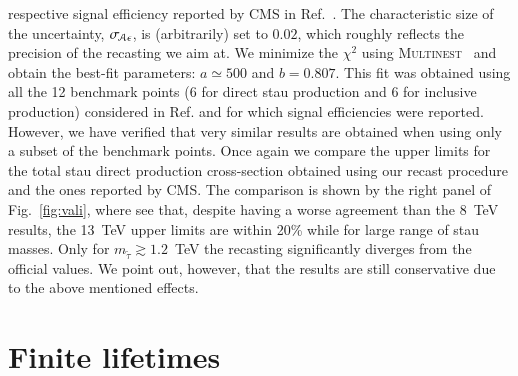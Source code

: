 \documentclass[preprint,number,sort&compress,twocolumn,3p]{elsstyarticle}
\newcommand{\com}[1]{\emph{\color{red}[#1]}}  %
\begin{document}
\begin{appendix}
respective signal efficiency reported by CMS in Ref.~\cite{CMS-PAS-EXO-16-036}. The
characteristic size of the uncertainty, $\sigma_{\!{\cal A}\epsilon}$, is (arbitrarily) set to $0.02$, which roughly
reflects the precision of the recasting we aim at.
We minimize the $\chi^2$ using \textsc{Multinest}~\cite{Feroz:2008xx,Feroz:2013hea} 
and obtain the best-fit parameters: $a\simeq 500 $ and $b=0.807$. This fit was obtained using all the 12 benchmark points (6 for direct stau production and 6 for inclusive production) considered in Ref.\cite{CMS-PAS-EXO-16-036} and for which 
signal efficiencies were reported.
However, we have verified that very similar results are obtained when using only a subset of the benchmark points.
Once again we compare the upper limits for the total stau direct production cross-section obtained using our recast procedure and the ones reported by CMS. The comparison is shown by the right panel of Fig.~\ref{fig:vali},
where see that, despite having a worse agreement than the 8~TeV results,
the 13~TeV upper limits are within 20\% while for large range of stau masses. Only for $m_{\tilde \tau} \gtrsim 1.2$~TeV the 
recasting significantly diverges from the official values. We point out, however, that the results are still conservative due to the above mentioned effects.



%
%
%


\section{Finite lifetimes}\label{app:lifetime}


\end{appendix}
\end{document}

